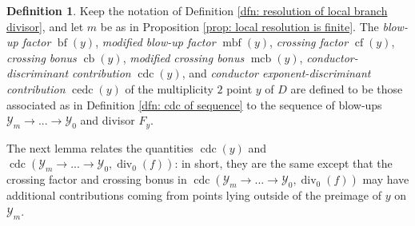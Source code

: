 \documentclass[12pt]{amsart}
\numberwithin{equation}{section}
\theoremstyle{definition}
\newtheorem{defn}[equation]{Definition}
\newcommand{\Y}{\mathcal{Y}}
\DeclareMathOperator{\divi}{div}
\DeclareMathOperator{\blf}{bf}
\DeclareMathOperator{\mbf}{mbf}
\DeclareMathOperator{\cf}{cf}
\DeclareMathOperator{\cb}{cb}
\DeclareMathOperator{\mcb}{mcb}
\DeclareMathOperator{\cdc}{cdc}
\DeclareMathOperator{\cedc}{cedc}
\begin{document}
\begin{defn}\label{dfn: cdc of multiplicity $2$ point}
    Keep the notation of Definition \ref{dfn: resolution of local branch divisor}, and let $m$ be as in Proposition \ref{prop: local resolution is finite}. The \textit{blow-up factor} $\blf(y)$, \textit{modified blow-up factor} $\mbf(y)$, \textit{crossing factor} $\cf(y)$, \textit{crossing bonus} $\cb(y)$, \textit{modified crossing bonus} $\mcb(y)$, 
    \textit{conductor-discriminant contribution} $\cdc(y)$, and
    \textit{conductor exponent-discriminant contribution} $\cedc(y)$ of the multiplicity $2$ point $y$ of $D$ are defined to be those associated as in Definition \ref{dfn: cdc of sequence} to the sequence of blow-ups $\Y_m\to...\to\Y_0$ and divisor $F_y$.
\end{defn}

The next lemma relates the quantities $\cdc(y)$ and $\cdc(\Y_m\to...\to\Y_0,\divi_0(f))$: in short, they are the same except that the crossing factor and crossing bonus in $\cdc(\Y_m\to...\to\Y_0,\divi_0(f))$ may have additional contributions coming from points lying outside of the preimage of $y$ on $\Y_m$.
\end{document}
